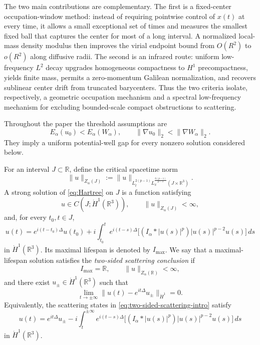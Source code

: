\documentclass[preprint,12pt]{elsarticle}
\numberwithin{equation}{section}
\theoremstyle{remark}
\newcommand{\R}{\mathbb R}
\newcommand{\dd}{\,d}
\newcommand{\Ecal}{E_{\alpha}}
\newcommand{\Znorm}{Z_{\alpha}}
\begin{document}
The two main contributions are complementary.  The first is a fixed-center occupation-window method: instead of requiring pointwise control of $x(t)$ at every time, it allows a small exceptional set of times and measures the smallest fixed ball that captures the center for most of a long interval.  A normalized local-mass density modulus then improves the virial endpoint bound from $O(R^2)$ to $o(R^2)$ along diffusive radii.  The second is an infrared route: uniform low-frequency $L^2$ decay upgrades homogeneous compactness to $H^1$ precompactness, yields finite mass, permits a zero-momentum Galilean normalization, and recovers sublinear center drift from truncated barycenters.  Thus the two criteria isolate, respectively, a geometric occupation mechanism and a spectral low-frequency mechanism for excluding bounded-scale compact obstructions to scattering.

Throughout the paper the threshold assumptions are
\begin{equation}\label{eq:below-threshold}
  \Ecal(u_0)<\Ecal(W_\alpha),
  \qquad
  \|\nabla u_0\|_2<\|\nabla W_\alpha\|_2.
\end{equation}
They imply a uniform potential-well gap for every nonzero solution considered below.

For an interval $J\subset\R$, define the critical spacetime norm
\begin{equation}\label{eq:Z-norm-intro}
  \|u\|_{\Znorm(J)}
  :=\|u\|_{L_t^{2(p-1)}L_x^{\frac{6(p-1)}{p-3}}(J\times\R^3)}.
\end{equation}
A strong solution of \eqref{eq:Hartree} on $J$ is a function satisfying
\[
  u\in C(J;\dot H^1(\R^3)),
  \qquad
  \|u\|_{\Znorm(J)}<\infty,
\]
and, for every $t_0,t\in J$,
\begin{equation}\label{eq:Duhamel-intro}
  u(t)=e^{i(t-t_0)\Delta}u(t_0)
  +i\int_{t_0}^{t}e^{i(t-s)\Delta}
  \bigl[(I_\alpha*|u(s)|^p)|u(s)|^{p-2}u(s)\bigr]\dd s
\end{equation}
in $\dot H^1(\R^3)$.  Its maximal lifespan is denoted by $I_{\max}$.
We say that a maximal-lifespan solution satisfies the \emph{two-sided scattering conclusion} if
\begin{equation}\label{eq:global-and-finite-Z-intro}
  I_{\max}=\R,
  \qquad
  \|u\|_{\Znorm(\R)}<\infty,
\end{equation}
and there exist $u_\pm\in\dot H^1(\R^3)$ such that
\begin{equation}\label{eq:two-sided-scattering-intro}
  \lim_{t\to\pm\infty}
  \|u(t)-e^{it\Delta}u_\pm\|_{\dot H^1}=0.
\end{equation}
Equivalently, the scattering states in \eqref{eq:two-sided-scattering-intro} satisfy
\begin{equation}\label{eq:duhamel-scattering-intro}
  u(t)=e^{it\Delta}u_\pm
  -i\int_t^{\pm\infty}e^{i(t-s)\Delta}
  \bigl[(I_\alpha*|u(s)|^p)|u(s)|^{p-2}u(s)\bigr]\dd s
\end{equation}
in $\dot H^1(\R^3)$.
\end{document}
